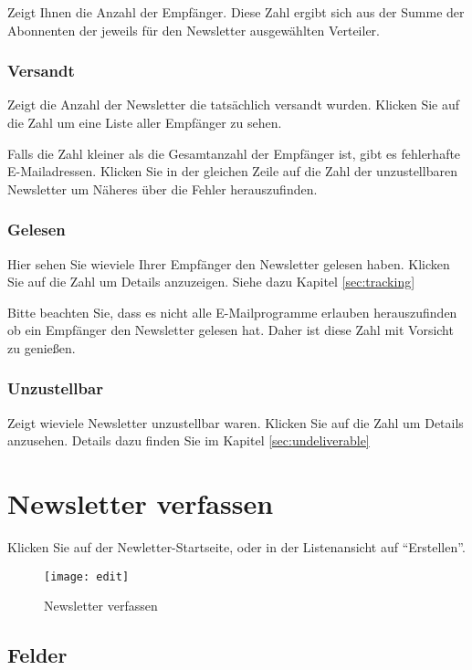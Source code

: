 \documentclass[article, a4paper, oneside, 11pt]{memoir}
\begin{document}
Zeigt Ihnen die Anzahl der Empfänger. Diese Zahl ergibt sich aus der Summe der Abonnenten der jeweils für den Newsletter ausgewählten Verteiler.

\subsection{Versandt}

Zeigt die Anzahl der Newsletter die tatsächlich versandt wurden. Klicken Sie auf die Zahl um eine Liste aller Empfänger zu sehen.

Falls die Zahl kleiner als die Gesamtanzahl der Empfänger ist, gibt es fehlerhafte E-Mailadressen. Klicken Sie in der gleichen Zeile auf die Zahl der unzustellbaren Newsletter um Näheres über die Fehler herauszufinden.

\subsection{Gelesen}

Hier sehen Sie wieviele Ihrer Empfänger den Newsletter gelesen haben. Klicken Sie auf die Zahl um Details anzuzeigen. Siehe dazu Kapitel \vref{sec:tracking}

Bitte beachten Sie, dass es nicht alle E-Mailprogramme erlauben herauszufinden ob ein Empfänger den Newsletter gelesen hat. Daher ist diese Zahl mit Vorsicht zu genießen.

\subsection{Unzustellbar}

Zeigt wieviele Newsletter unzustellbar waren. Klicken Sie auf die Zahl um Details anzusehen. Details dazu finden Sie im Kapitel \vref{sec:undeliverable}



\chapter{Newsletter verfassen}
\label{sec:edit}

Klicken Sie auf der Newletter-Startseite, oder in der Listenansicht auf "`Erstellen"'.

\begin{figure}[htp]
\centering
\texttt{[image: edit]}
\caption{Newsletter verfassen}
\label{fig:edit}
\end{figure}

\section{Felder}
\end{document}
